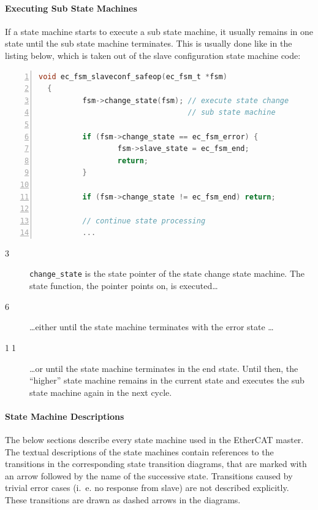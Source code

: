 \documentclass[a4paper,12pt,BCOR6mm,bibtotoc,idxtotoc]{scrbook}
\newcommand{\linenum}[1]{\normalfont\textcircled{\tiny #1}}
\begin{document}
\paragraph{Executing Sub State Machines}

If a state machine starts to execute a sub state machine, it usually
remains in one state until the sub state machine terminates. This is
usually done like in the listing below, which is taken out of the
slave configuration state machine code:

\begin{lstlisting}[gobble=2,language=C,numbers=left]
  void ec_fsm_slaveconf_safeop(ec_fsm_t *fsm)
  {
          fsm->change_state(fsm); // execute state change
                                  // sub state machine

          if (fsm->change_state == ec_fsm_error) {
                  fsm->slave_state = ec_fsm_end;
                  return;
          }

          if (fsm->change_state != ec_fsm_end) return;

          // continue state processing
          ...
\end{lstlisting}

\begin{description}

\item[\linenum{3}] \lstinline+change_state+ is the state pointer of the state
change state machine. The state function, the pointer points on, is
executed\ldots

\item[\linenum{6}] \ldots either until the state machine terminates with the
error state \ldots

\item[\linenum{11}] \ldots or until the state machine terminates in the end
state. Until then, the ``higher'' state machine remains in the current state
and executes the sub state machine again in the next cycle.

\end{description}

\paragraph{State Machine Descriptions}

The below sections describe every state machine used in the EtherCAT master.
The textual descriptions of the state machines contain references to the
transitions in the corresponding state transition diagrams, that are marked
with an arrow followed by the name of the successive state. Transitions caused
by trivial error cases (i.~e. no response from slave) are not described
explicitly. These transitions are drawn as dashed arrows in the diagrams.
\end{document}

